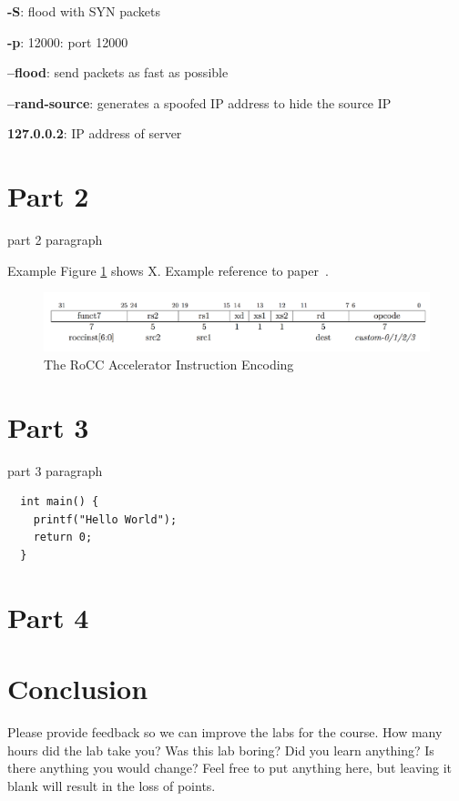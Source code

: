 \documentclass[11pt]{article}
\begin{document}
\textbf{-S}: flood with SYN packets

\textbf{-p}: 12000: port 12000

\textbf{--flood}: send packets as fast as possible

\textbf{--rand-source}: generates a spoofed IP address to hide the source IP

\textbf{127.0.0.2}: IP address of server

\section{Part 2}
\label{sec:part-2}
part 2 paragraph

Example Figure \ref{fig:rocc-encoding} shows X. Example reference to paper~\cite{Brasser17}.

\begin{figure}[htbp]
\centering
\includegraphics[width=.9\linewidth]{./rocc-encoding.png}
\caption{\label{fig:rocc-encoding}
The RoCC Accelerator Instruction Encoding}
\end{figure}
\section{Part 3}

\label{sec:part-3}
part 3 paragraph

\begin{verbatim}
  int main() {
    printf("Hello World");
    return 0;
  }
\end{verbatim}

\section{Part 4}
\label{sec:part-4}

\section{Conclusion}
\label{sec:conclusion}
Please provide feedback so we can improve the labs for the course. How many
hours did the lab take you? Was this lab boring? Did you learn anything? Is
there anything you would change? Feel free to put anything here, but leaving it
blank will result in the loss of points.



\end{document}
